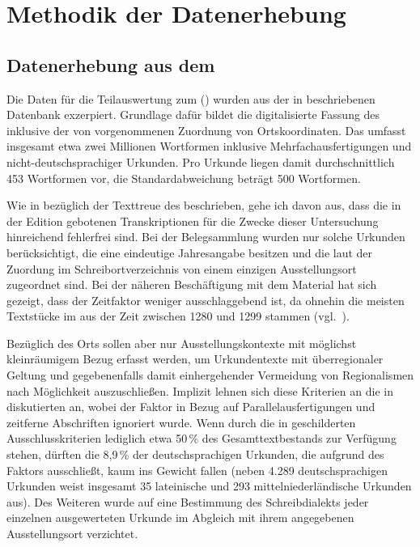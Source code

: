 \chapter{Methodik der Datenerhebung}
\label{ch:methoden}

\section%
	{Datenerhebung aus dem }
\label{sec:miningcao}

Die Daten für die Teilauswertung zum  (\CAO) wurden aus der in
\textcites[207]{beckerschallert2021}[155--158]{beckerschallert2022b}
beschriebenen Datenbank exzerpiert. Grundlage dafür bildet die digitalisierte
Fassung des \CAO{} \autocites{cao-online}[vgl.~dazu][]{gniffkerapp2005}
inklusive der von \citeauthor{beckerschallert2022b} vorgenommenen Zuordnung von
Ortskoordinaten. Das \CAO{} umfasst insgesamt etwa zwei Millionen Wortformen
inklusive Mehrfachausfertigungen und nicht-deutschsprachiger Urkunden. Pro
Urkunde liegen damit durchschnittlich 453 Wortformen vor, die
Standardabweichung beträgt 500 Wortformen.

Wie in  bezüglich der Text\-treue des \CAO{}
beschrieben, gehe ich davon aus, dass die in der Edition gebotenen
Transkriptionen für die Zwecke dieser Untersuchung hinreichend fehlerfrei sind.
Bei der Belegsammlung wurden nur solche Urkunden berücksichtigt, die eine
eindeutige Jahresangabe besitzen und die laut der Zuordung im
Schreibortverzeichnis von \citet{cao-online} einem einzigen Ausstellungsort
zugeordnet sind. Bei der näheren Beschäftigung mit dem Material hat sich
gezeigt, dass der Zeitfaktor weniger ausschlaggebend ist, da ohnehin die
meisten Textstücke im \CAO{} aus der Zeit zwischen 1280 und 1299 stammen
(vgl.~).

Bezüglich des Orts sollen aber nur Ausstellungs\-kontexte mit möglichst
kleinräumigem Bezug erfasst werden, um Urkundentexte mit überregionaler Geltung
und gegebenenfalls damit einhergehender Vermeidung von Regionalismen nach
Möglichkeit auszuschließen. Implizit lehnen sich diese Kriterien an die in
\citet[41--42]{ganslmayer2012} diskutierten an, wobei der Faktor  in
Bezug auf Parallelausfertigungen und zeitferne Abschriften ignoriert wurde.
Wenn durch die in \citet[155--158]{beckerschallert2022b} geschilderten
Ausschlusskriterien lediglich etwa 50\,\% des Gesamttextbestands zur Verfügung
stehen, dürften die 8,9\,\% der deutschsprachigen Urkunden, die
\citeauthor{ganslmayer2012} aufgrund des Faktors  ausschließt, kaum ins
Gewicht fallen (neben 4.289 deutschsprachigen Urkunden weist
\cite[41]{ganslmayer2012} insgesamt 35 lateinische und 293
mittelniederländische Urkunden aus). Des Weiteren
wurde auf eine Bestimmung des Schreibdialekts jeder einzelnen ausgewerteten
Urkunde im Abgleich mit ihrem angegebenen Ausstellungsort verzichtet.

